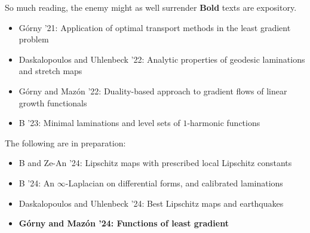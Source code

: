 \documentclass[10pt]{beamer}
\begin{document}
\begin{frame}{So much reading, the enemy might as well surrender}
\textbf{Bold} texts are expository.
\begin{itemize}
\item G\'orny '21: Application of optimal transport methods in the least gradient problem
\item Daskalopoulos and Uhlenbeck '22: Analytic properties of geodesic laminations and stretch maps
\item G\'orny and Maz\'on '22: Duality-based approach to gradient flows of linear growth functionals
\item B '23: Minimal laminations and level sets of $1$-harmonic functions 
\end{itemize}
The following are in preparation:
\begin{itemize}
\item B and Ze-An '24: Lipschitz maps with prescribed local Lipschitz constants
\item B '24: An $\infty$-Laplacian on differential forms, and calibrated laminations
\item Daskalopoulos and Uhlenbeck '24: Best Lipschitz maps and earthquakes
\item \textbf{G\'orny and Maz\'on '24: Functions of least gradient}
\end{itemize}
\end{frame}
\end{document}
